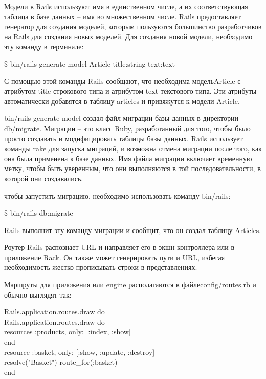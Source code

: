 Модели в Rails используют имя в единственном числе, а их соответствующая таблица в базе данных -- имя во множественном
числе. Rails предоставляет генератор для создания моделей, которым пользуются большинство разработчиков на Rails для
создания новых моделей. Для создания новой модели, необходимо эту команду в терминале:

\begin{flushleft}
  \qquad\qquad\qquad \$ bin/rails generate model Article title:string text:text
\end{flushleft}

С помощью этой команды Rails сообщают, что необходима модель\linebreak Article с атрибутом title строкового типа и атрибутом text
текстового типа. Эти атрибуты автоматически добавятся в таблицу articles и привяжутся к модели Article.

bin/rails generate model создал файл миграции базы данных в директории db/migrate. Миграции -- это класс Ruby,
разработанный для того, чтобы было просто создавать и модифицировать таблицы базы данных. Rails использует команды
rake для запуска миграций, и возможна отмена миграции после того, как она была применена к базе данных. Имя файла
миграции включает временную метку, чтобы быть уверенным, что они выполняются в той последовательности, в которой они
создавались.

чтобы запустить миграцию, необходимо использовать команду bin/rails:

\begin{flushleft}
  \qquad\qquad\qquad \$ bin/rails db:migrate
\end{flushleft}

Rails выполнит эту команду миграции и сообщит, что он создал таблицу Articles.

Роутер Rails распознает URL и направляет его в экшн контроллера или в приложение Rack. Он также может генерировать пути
и URL, избегая необходимость жестко прописывать строки в представлениях.

Маршруты для приложения или engine располагаются в файле\linebreak config/routes.rb и обычно выглядят так:

\begin{flushleft}
	\qquad\qquad\qquad Rails.application.routes.draw do\\
	\qquad\qquad\qquad\quad Rails.application.routes.draw do\\
	\qquad\qquad\qquad\quad\quad resources :products, only: [:index, :show]\\
	\qquad\qquad\qquad\quad end\\
	\qquad\qquad\qquad\quad resource :basket, only: [:show, :update, :destroy]\\
	\qquad\qquad\qquad\quad resolve("Basket") { route\_for(:basket) }\\
	\qquad\qquad\qquad end
\end{flushleft}

